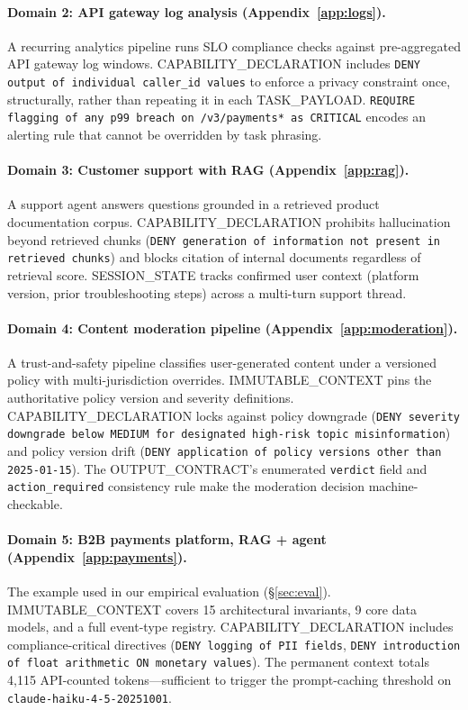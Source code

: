 \documentclass[11pt]{article}
\begin{document}
\paragraph{Domain 2: API gateway log analysis (Appendix~\ref{app:logs}).}
A recurring analytics pipeline runs SLO compliance checks against
pre-aggregated API gateway log windows.
CAPABILITY\_DECLARATION includes \texttt{DENY output of individual caller\_id
values} to enforce a privacy constraint once, structurally, rather than
repeating it in each TASK\_PAYLOAD. \texttt{REQUIRE flagging of any p99
breach on /v3/payments* as CRITICAL} encodes an alerting rule that cannot
be overridden by task phrasing.

\paragraph{Domain 3: Customer support with RAG (Appendix~\ref{app:rag}).}
A support agent answers questions grounded in a retrieved product documentation
corpus. CAPABILITY\_DECLARATION prohibits hallucination beyond retrieved
chunks (\texttt{DENY generation of information not present in retrieved
chunks}) and blocks citation of internal documents regardless of retrieval
score. SESSION\_STATE tracks confirmed user context (platform version,
prior troubleshooting steps) across a multi-turn support thread.

\paragraph{Domain 4: Content moderation pipeline (Appendix~\ref{app:moderation}).}
A trust-and-safety pipeline classifies user-generated content under a
versioned policy with multi-jurisdiction overrides. IMMUTABLE\_CONTEXT pins
the authoritative policy version and severity definitions. CAPABILITY\_DECLARATION
locks against policy downgrade (\texttt{DENY severity downgrade below MEDIUM
for designated high-risk topic misinformation}) and policy version drift
(\texttt{DENY application of policy versions other than 2025-01-15}).
The OUTPUT\_CONTRACT's enumerated \texttt{verdict} field and \texttt{action\_required}
consistency rule make the moderation decision machine-checkable.

\paragraph{Domain 5: B2B payments platform, RAG + agent (Appendix~\ref{app:payments}).}
The example used in our empirical evaluation (\S\ref{sec:eval}).
IMMUTABLE\_CONTEXT covers 15 architectural invariants, 9 core data models,
and a full event-type registry. CAPABILITY\_DECLARATION includes
compliance-critical directives (\texttt{DENY logging of PII fields},
\texttt{DENY introduction of float arithmetic ON monetary values}).
The permanent context totals 4{,}115 API-counted tokens---sufficient to trigger
the prompt-caching threshold on \texttt{claude-haiku-4-5-20251001}.
\end{document}
